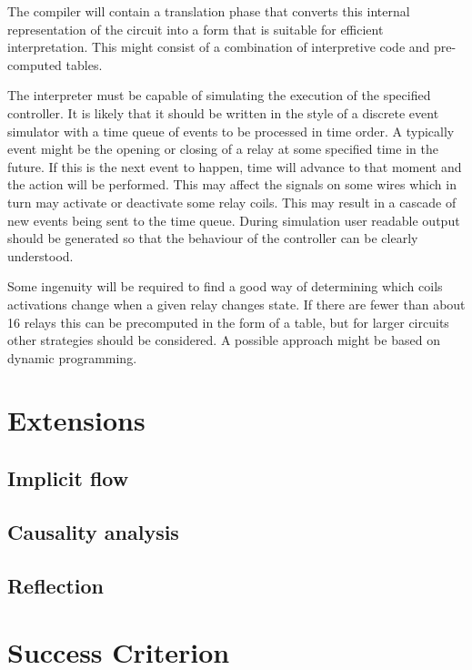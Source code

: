 \documentclass[12pt]{article}
\begin{document}
The compiler will contain a translation phase that converts this
internal representation of the circuit into a form that is suitable
for efficient interpretation.  This might consist of a combination of
interpretive code and pre-computed tables.

The interpreter must be capable of simulating the execution of the
specified controller.  It is likely that it should be written in the
style of a discrete event simulator with a time queue of events to be
processed in time order. A typically event might be the opening or
closing of a relay at some specified time in the future. If this is
the next event to happen, time will advance to that moment and the
action will be performed.  This may affect the signals on some wires
which in turn may activate or deactivate some relay coils. This may
result in a cascade of new events being sent to the time queue. During
simulation user readable output should be generated so that the
behaviour of the controller can be clearly understood.

Some ingenuity will be required to find a good way of determining
which coils activations change when a given relay changes state.  If
there are fewer than about 16 relays this can be precomputed in the
form of a table, but for larger circuits other strategies should be
considered. A possible approach might be based on dynamic programming.


\section*{Extensions}

\subsection*{Implicit flow}

\subsection*{Causality analysis}
 
\subsection*{Reflection}

\subsection*{}


\section*{Success Criterion}
\end{document}
